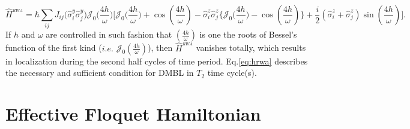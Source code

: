 \documentclass[%
reprint,
superscriptaddress,
amsmath,amssymb,showkeys,
aps,
prb,
]{revtex4-2}
\begin{document}
	\begin{equation}
		\hat{H}^{_{RWA}} = \hbar\sum_{ij} J_{ij} \Big(\hat{\sigma}^y_i\hat{\sigma}^y_j\Big) \mathcal{J}_0\Big(\frac{4h}{\omega}\Big)\Bigg[\mathcal{J}_0\Big(\frac{4h}{\omega}\Big) + \cos(\frac{4h}{\omega}) -\hat{\sigma}^z_i\hat{\sigma}^z_j \bigg\{\mathcal{J}_0\Big(\frac{4h}{\omega}\Big) - \cos(\frac{4h}{\omega})\bigg\} + \frac{i}{2} (\hat{\sigma}^z_i + \hat{\sigma}^z_j) \sin(\frac{4h}{\omega})\Bigg].
		\label{eq:hrwa}
	\end{equation}	
	If $h$ and $\omega$ are controlled in such fashion that $\left(\frac{4h}{\omega}\right)$ is one the roots of Bessel's function of the first kind (${i.e.}$ $\mathcal{J}_0\left(\frac{4h}{\omega}\right)$), then $\hat{H}^{_{RWA}}$ vanishes totally, which results in localization during the second half cycles of time period. Eq.\eqref{eq:hrwa} describes the necessary and sufficient condition for DMBL in $T_2$ time cycle(s). 
	
	\section{\label{sec:AppendixB} Effective Floquet Hamiltonian}
	
\end{document}
